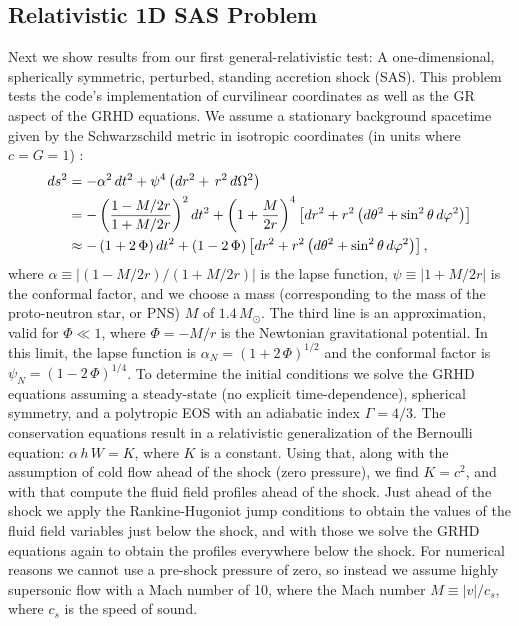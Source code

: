 \documentclass[letterpaper]{jpconf}
\newcommand{\Msun}{M_{\odot}}
\begin{document}
 \subsection{Relativistic 1D SAS Problem}
Next we show results from our first general-relativistic test: A one-dimensional, spherically symmetric, perturbed, standing accretion shock (SAS). This problem tests the code's implementation of curvilinear coordinates as well as the GR aspect of the GRHD equations. We assume a stationary background spacetime given by the Schwarzschild metric in isotropic coordinates (in units where $c=G=1$) \cite{BaumgarteShapiroNumericalRelativity}:
 \begin{align}
 ds^{2}&=-\alpha^{2}\,dt^{2}+\psi^{4}\left(dr^{2}+\,r^{2}\,d\Omega^{2}\right)\notag\\
 &=-\left(\frac{1-M/2r}{1+M/2r}\right)^{2}dt^{2}+\left(1+\frac{M}{2r}\right)^{4}\left[dr^{2}+r^{2}\left(d\theta^{2}+\sin^{2}\theta\,d\varphi^{2}\right)\right]\\
 &\approx-\left(1+2\,\Phi\right)dt^{2}+\left(1-2\,\Phi\right)\left[dr^{2}+r^{2}\left(d\theta^{2}+\sin^{2}\theta\,d\varphi^{2}\right)\right],\label{eq.NewtonianLapse}
 \end{align}
 where $\alpha\equiv\left|\left(1-M/2r\right)/\left(1+M/2r\right)\right|$ is the lapse function, $\psi\equiv\left|1+M/2r\right|$ is the conformal factor, and we choose a mass (corresponding to the mass of the proto-neutron star, or PNS) $M$ of $1.4\,\Msun$. The third line is an approximation, valid for $\Phi\ll1$, where $\Phi=-M/r$ is the Newtonian gravitational potential. In this limit, the lapse function is $\alpha_{N}=\left(1+2\,\Phi\right)^{1/2}$ and the conformal factor is $\psi_{N}=\left(1-2\,\Phi\right)^{1/4}$. To determine the initial conditions we solve the GRHD equations assuming a steady-state (no explicit time-dependence), spherical symmetry, and a polytropic EOS with an adiabatic index $\Gamma=4/3$. The conservation equations result in a relativistic generalization of the Bernoulli equation: $\alpha\,h\,W=K$, where $K$ is a constant. Using that, along with the assumption of cold flow ahead of the shock (zero pressure), we find $K=c^{2}$, and with that compute the fluid field profiles ahead of the shock. Just ahead of the shock we apply the Rankine-Hugoniot jump conditions to obtain the values of the fluid field variables just below the shock, and with those we solve the GRHD equations again to obtain the profiles everywhere below the shock. For numerical reasons we cannot use a pre-shock pressure of zero, so instead we assume highly supersonic flow with a Mach number of 10, where the Mach number $M\equiv \left|v\right|/c_{s}$, where $c_{s}$ is the speed of sound.
\end{document}
